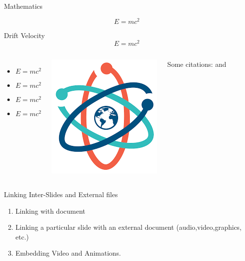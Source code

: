 \documentclass[12pt,aspect=169]{beamer}
\begin{document}
\begin{frame}{Mathematics}


$$ E=mc^2 $$
\scriptsize

\begin{block}{Drift Velocity}
	$$ E=mc^2 $$
\end{block}

\begin{columns}[T]
\begin{itemize}
	\item $$ E=mc^2 $$
	\item $$ E=mc^2 $$
	\item $$ E=mc^2 $$
	\item $$ E=mc^2 $$
\end{itemize}

\includegraphics[width=\linewidth]{science}

Some citations: \cite{1} and \cite{2}
\end{columns}

\end{frame}


\begin{frame}[t]{Linking Inter-Slides and External files}
\scriptsize
\begin{enumerate}[t]\setlength{\itemsep}{20pt}
	\item Linking with document
	\item Linking a particular slide with an external document (audio,video,graphics, etc.)
	\item Embedding Video and Animations. \cite{1}
\end{enumerate}

\end{frame}
\end{document}
